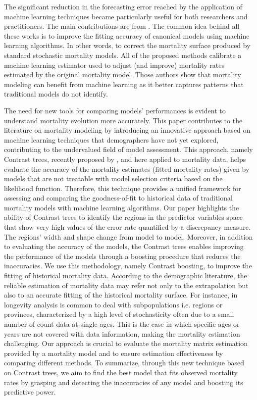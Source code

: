 \documentclass[a4,11pt]{article}
\begin{document}
The significant reduction in the forecasting error reached by the application of machine learning techniques became particularly useful for both researchers and practitioners. The main contributions are from \cite{Deprez,LevPiz,LevNi}. The common idea behind all these works is to improve the fitting accuracy of canonical models using machine learning algorithms. In other words, to correct the mortality surface produced by standard stochastic mortality models. All of the proposed methods calibrate a machine learning estimator used to adjust (and improve) mortality rates estimated by the original mortality model. Those authors show that mortality modeling can benefit from machine learning as it better captures patterns that traditional models do not identify. 

The need for new tools for comparing models' performances is evident to understand mortality evolution more accurately. 
This paper contributes to the literature on mortality modeling by introducing an innovative approach based on machine learning techniques that demographers have not yet explored, contributing to the undervalued field of model assessment. 
This approach, namely Contrast trees, recently proposed by \cite{Friedman2020}, and here applied to mortality data, helps evaluate the accuracy of the mortality estimates (fitted mortality rates) given by models that are not treatable with model selection criteria based on the likelihood function. Therefore, this technique provides a unified framework for assessing and comparing the goodness-of-fit to historical data of traditional mortality models with machine learning algorithms.
Our paper highlights the ability of Contrast trees to identify the regions in the predictor variables space that show very high values of the error rate quantified by a discrepancy measure. The regions’ width and shape change from model to model.
Moreover, in addition to evaluating the accuracy of the models, the Contrast trees enables improving the performance of the models through a boosting procedure that reduces the inaccuracies. We use this methodology, namely Contrast boosting, to improve the fitting of historical mortality data.
According to the demographic literature, the reliable estimation of mortality data may refer not only to the extrapolation but also to an accurate fitting of the historical mortality surface. For instance, in longevity analysis is common to deal with subpopulations i.e. regions or provinces, characterized by a high level of stochasticity often due to a small number of count data at single ages. This is the case in which specific ages or years are not covered with data information, making the mortality estimation challenging. Our approach is crucial to evaluate the mortality matrix estimation provided by a mortality model and to ensure estimation effectiveness by comparing different methods.
To summarize, through this new technique based on Contrast trees, we aim to find the best model that fits observed mortality rates by grasping and detecting the inaccuracies of any model and boosting its predictive power. 
\end{document}
